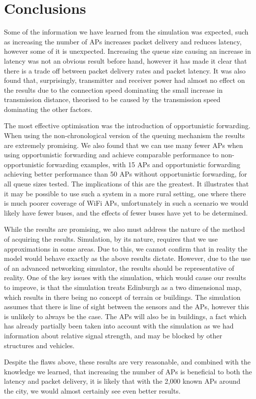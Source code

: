     \section{Conclusions}\label{data_gathering_performance_conclusions}

        Some of the information we have learned from the simulation was expected, such as increasing the number of APs increases packet delivery and reduces latency, however some of it is unexpected. Increasing the queue size causing an increase in latency was not an obvious result before hand, however it has made it clear that there is a trade off between packet delivery rates and packet latency. It was also found that, surprisingly, transmitter and receiver power had almost no effect on the results due to the connection speed dominating the small increase in transmission distance, theorised to be caused by the transmission speed dominating the other factors.

        The most effective optimisation was the introduction of opportunistic forwarding. When using the non-chronological version of the queuing mechanism the results are extremely promising. We also found that we can use many fewer APs when using opportunistic forwarding and achieve comparable performance to non-opportunistic forwarding examples, with 15 APs and opportunistic forwarding achieving better performance than 50 APs without opportunistic forwarding, for all queue sizes tested. The implications of this are the greatest. It illustrates that it may be possible to use such a system in a more rural setting, one where there is much poorer coverage of WiFi APs, unfortunately in such a scenario we would likely have fewer buses, and the effects of fewer buses have yet to be determined. 

        While the results are promising, we also must address the nature of the method of acquiring the results. Simulation, by its nature, requires that we use approximations in some areas. Due to this, we cannot confirm that in reality the model would behave exactly as the above results dictate. However, due to the use of an advanced networking simulator, the results should be representative of reality. One of the key issues with the simulation, which would cause our results to improve, is that the simulation treats Edinburgh as a two dimensional map, which results in there being no concept of terrain or buildings. The simulation assumes that there is line of sight between the sensors and the APs, however this is unlikely to always be the case. The APs will also be in buildings, a fact which has already partially been taken into account with the simulation as we had information about relative signal strength, and may be blocked by other structures and vehicles. 

        Despite the flaws above, these results are very reasonable, and combined with the knowledge we learned, that increasing the number of APs is beneficial to both the latency and packet delivery, it is likely that with the 2,000 known APs around the city, we would almost certainly see even better results.


